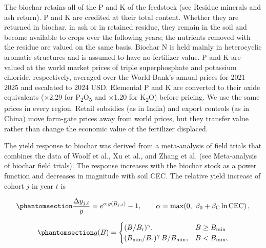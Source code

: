 \documentclass[
  letterpaper,
  twoside,
  twocolumn,
  9pt]{article}
\begin{document}
The biochar retains all of the P and K of the feedstock (see Residue
minerals and ash return). P and K are credited at their total content.
Whether they are returned in biochar, in ash or in retained residue,
they remain in the soil and become available to crops over the following
years; the nutrients removed with the residue are valued on the same
basis. Biochar N is held mainly in heterocyclic aromatic structures and
is assumed to have no fertilizer value. P and K are valued at the world
market prices of triple superphosphate and potassium chloride,
respectively, averaged over the World Bank's annual prices for
2021--2025 and escalated to 2024 USD.\citep{worldbank2026pinksheet}
Elemental P and K are converted to their oxide equivalents (×2.29 for
P\textsubscript{2}O\textsubscript{5} and ×1.20 for K\textsubscript{2}O)
before pricing. We use the same prices in every region. Retail subsidies
(as in India) and export controls (as in China) move farm-gate prices
away from world prices, but they transfer value rather than change the
economic value of the fertilizer displaced.

The yield response to biochar was derived from a meta-analysis of field
trials that combines the data of Woolf et al.\citep{woolf2016optimal},
Xu et al.\citep{xu2021}, and Zhang et al.\citep{zhang2023} (see
Meta-analysis of biochar field trials). The response increases with the
biochar stock as a power function and decreases in magnitude with soil
CEC. The relative yield increase of cohort \(j\) in year \(t\) is

\begin{equation}\phantomsection\label{eq-yield-response}{\frac{\Delta y_{j,t}}{y} = e^{\alpha\, g(B_{j,t})} - 1, \qquad \alpha = \max\!\left(0,\ \beta_0 + \beta_{\mathrm{C}} \ln \mathrm{CEC}\right),}\end{equation}

\begin{equation}\phantomsection\label{eq-dose-shape}{g(B) = \begin{cases} (B/B_{\mathrm{r}})^{\gamma}, & B \ge B_{\mathrm{min}} \\ (B_{\mathrm{min}}/B_{\mathrm{r}})^{\gamma}\, B / B_{\mathrm{min}}, & B < B_{\mathrm{min}}, \end{cases}}\end{equation}
\end{document}
